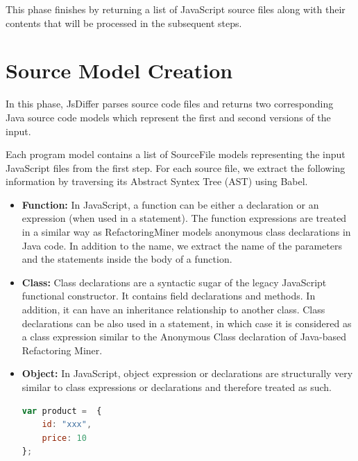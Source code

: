 \documentclass[letterpaper,12pt,onecolumn,final]{report}
\begin{document}
This phase finishes by returning a list of JavaScript source files along with their contents that will be processed in the subsequent steps.

\section {Source Model Creation}
In this phase, JsDiffer parses source code files and returns two corresponding Java source code models which represent the first and second versions of the input.

Each program model contains a list of SourceFile models representing the input JavaScript files from the first step. For each source file, we extract the following information by traversing its Abstract Syntex Tree (AST) using Babel.

\begin{itemize}
\item \textbf{Function:} In JavaScript, a function can be either a declaration or an expression (when used in a statement). The function expressions are treated in a similar way as RefactoringMiner models anonymous class declarations in Java code. In addition to the name, we extract the name of the parameters and the statements inside the body of a function. 

\item \textbf{Class:} Class declarations are a syntactic sugar of the legacy JavaScript functional constructor. It contains field declarations and methods. In addition, it can have an inheritance relationship to another class. Class declarations can be also used in a statement, in which case it is considered as a class expression similar to the Anonymous Class declaration of Java-based Refactoring Miner.

\item \textbf{Object:} In JavaScript, object expression or declarations are structurally very similar to class expressions or declarations and therefore treated as such.

\begin{lstlisting}[language=JavaScript, caption=Object expression assigned to a variable, numbers=none, label={lst:objectLieral}]
var product =  {
    id: "xxx",
    price: 10
};
\end{lstlisting}


\end{itemize}
\end{document}

